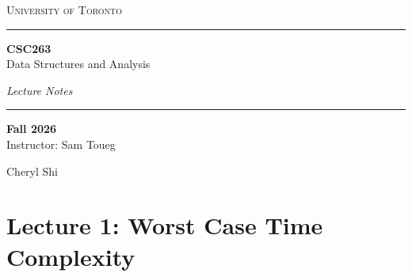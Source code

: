\documentclass[11pt]{article}
\begin{document}
\begin{titlepage}
\thispagestyle{empty}
\centering
\vspace*{1.2cm}
{\small\textcolor{greyline}{\scshape University of Toronto}}\\[4pt]

\vspace{1.0cm}
\textcolor{violetT}{\rule{0.72\linewidth}{1.4pt}}

\vspace{0.7cm}
{\fontsize{62}{62}\selectfont\bfseries\textcolor{utnavy}{CSC263}}\\[10pt]
{\LARGE\textcolor{utnavy}{Data Structures and Analysis}}

\vspace{0.5cm}
{\large\itshape\textcolor{greyline}{Lecture Notes}}\\[4pt]

\vspace{0.5cm}
\textcolor{violetT}{\rule{0.72\linewidth}{1.4pt}}

\vspace{0.7cm}
{\large\textbf{Fall 2026}}\\[6pt]
{\normalsize\textcolor{greyline}{Instructor: Sam Toueg}}

\vspace{0.5cm}
{\Large\textcolor{utnavy}{Cheryl Shi}}

\vfill
\end{titlepage}
\setcounter{page}{1}

\pagestyle{fancy}
\fancyhf{}
\renewcommand{\headrulewidth}{0.4pt}
\fancyhead[L]{\small\textcolor{violetT}{CSC263 \;$\vert$\; Data Structures and Analysis}}
\fancyhead[R]{\small\textcolor{greyline}{Cheryl Shi}}
\fancyfoot[C]{\small\textcolor{greyline}{\thepage}}

\begingroup
\hypersetup{linkcolor=utnavy}
\renewcommand{\contentsname}{\textcolor{utnavy}{Contents}}
\setlength{\parskip}{0pt}
\tableofcontents
\endgroup
\newpage


\part*{\textcolor{utnavy}{Lecture 1: Worst Case Time Complexity}}
\setcounter{section}{0}
\end{document}
